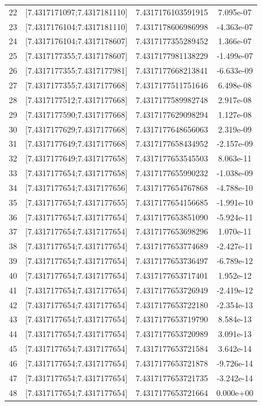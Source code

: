 \documentclass[polish, 11pt, oneside]{article}   	%
\begin{document}
\begin{center}
\begin{tabular}{ |c|c|c|c| }
 22 & [7.4317171097;7.4317181110] & 7.4317176103591915 &    7.095e-07 \\ 
 23 & [7.4317176104;7.4317181110] & 7.4317178606986998 &   -4.363e-07 \\ 
 24 & [7.4317176104;7.4317178607] & 7.4317177355289452 &    1.366e-07 \\ 
 25 & [7.4317177355;7.4317178607] & 7.4317177981138229 &   -1.499e-07 \\ 
 26 & [7.4317177355;7.4317177981] & 7.4317177668213841 &   -6.633e-09 \\ 
 27 & [7.4317177355;7.4317177668] & 7.4317177511751646 &    6.498e-08 \\ 
 28 & [7.4317177512;7.4317177668] & 7.4317177589982748 &    2.917e-08 \\ 
 29 & [7.4317177590;7.4317177668] & 7.4317177629098294 &    1.127e-08 \\ 
 30 & [7.4317177629;7.4317177668] & 7.4317177648656063 &    2.319e-09 \\ 
 31 & [7.4317177649;7.4317177668] & 7.4317177658434952 &   -2.157e-09 \\ 
 32 & [7.4317177649;7.4317177658] & 7.4317177653545503 &    8.063e-11 \\ 
 33 & [7.4317177654;7.4317177658] & 7.4317177655990232 &   -1.038e-09 \\ 
 34 & [7.4317177654;7.4317177656] & 7.4317177654767868 &   -4.788e-10 \\ 
 35 & [7.4317177654;7.4317177655] & 7.4317177654156685 &   -1.991e-10 \\ 
 36 & [7.4317177654;7.4317177654] & 7.4317177653851090 &   -5.924e-11 \\ 
 37 & [7.4317177654;7.4317177654] & 7.4317177653698296 &    1.070e-11 \\ 
 38 & [7.4317177654;7.4317177654] & 7.4317177653774689 &   -2.427e-11 \\ 
 39 & [7.4317177654;7.4317177654] & 7.4317177653736497 &   -6.789e-12 \\ 
 40 & [7.4317177654;7.4317177654] & 7.4317177653717401 &    1.952e-12 \\ 
 41 & [7.4317177654;7.4317177654] & 7.4317177653726949 &   -2.419e-12 \\ 
 42 & [7.4317177654;7.4317177654] & 7.4317177653722180 &   -2.354e-13 \\ 
 43 & [7.4317177654;7.4317177654] & 7.4317177653719790 &    8.584e-13 \\ 
 44 & [7.4317177654;7.4317177654] & 7.4317177653720989 &    3.091e-13 \\ 
 45 & [7.4317177654;7.4317177654] & 7.4317177653721584 &    3.642e-14 \\ 
 46 & [7.4317177654;7.4317177654] & 7.4317177653721878 &   -9.726e-14 \\ 
 47 & [7.4317177654;7.4317177654] & 7.4317177653721735 &   -3.242e-14 \\ 
 48 & [7.4317177654;7.4317177654] & 7.4317177653721664 &    0.000e+00 \\ 
  \hline
\end{tabular}
\end{center}
\end{document}
